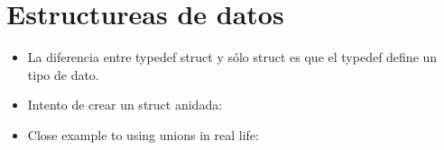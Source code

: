 \section{Estructureas de datos}
\begin{itemize}
    \item La diferencia entre typedef struct y sólo struct es que el typedef define un tipo de dato.
    \item Intento de crear un struct anidada:
    
    \item Close example to using unions in real life:
\end{itemize}

